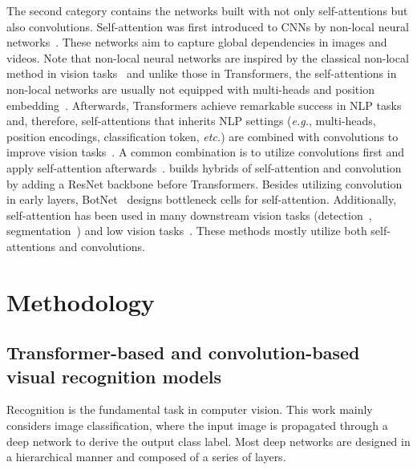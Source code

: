 \documentclass[10pt,twocolumn,letterpaper]{article}
\begin{document}
The second category contains the networks built with not only self-attentions but also convolutions. Self-attention was first introduced to CNNs by non-local neural networks~\cite{wang2018non}. These networks aim to capture global dependencies in images and videos. Note that non-local neural networks are inspired by the classical non-local method in vision tasks~\cite{buades2005non} and unlike those in Transformers, the self-attentions in non-local networks are usually not equipped with multi-heads and position embedding~\cite{wang2018non, cao2019gcnet, li2020neural}. Afterwards, Transformers achieve remarkable success in NLP tasks~\cite{devlin2018bert,radford2018improving} and, therefore, self-attentions that inherits NLP settings (\textit{e.g.}, multi-heads, position encodings, classification token, \textit{etc.}) are combined with convolutions to improve vision tasks~\cite{ramachandran2019stand, bello2019attention, bello2021lambdanetworks}. A common combination is to utilize convolutions first and apply self-attention afterwards~\cite{dosovitskiy2020image, srinivas2021bottleneck}. \cite{dosovitskiy2020image} builds hybrids of self-attention and convolution by adding a ResNet backbone before Transformers.  Besides utilizing convolution in early layers, BotNet~\cite{srinivas2021bottleneck} designs bottleneck cells for self-attention. Additionally, self-attention has been used in many downstream vision tasks (detection~\cite{carion2020end}, segmentation~\cite{chen2021transunet}) and low vision tasks~\cite{chen2020pre}. These methods mostly utilize both self-attentions and convolutions.

\section{Methodology}
\label{methodology}

\subsection{Transformer-based and convolution-based visual recognition models}
\label{methodology:baselines}

Recognition is the fundamental task in computer vision. This work mainly considers image classification, where the input image is propagated through a deep network to derive the output class label. Most deep networks are designed in a hierarchical manner and composed of a series of layers.
\end{document}
